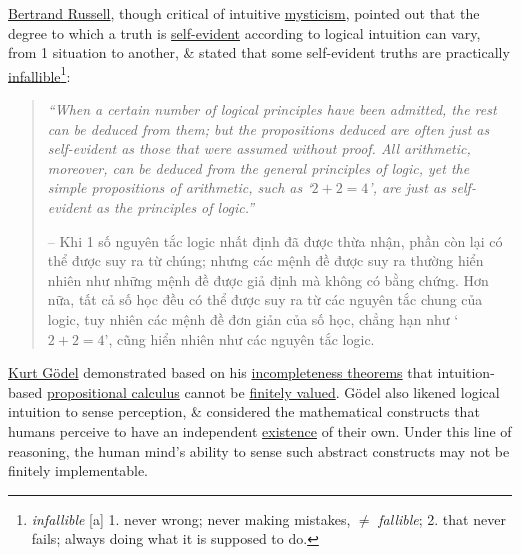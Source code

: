 \documentclass{article}
\begin{document}
\href{https://en.wikipedia.org/wiki/Bertrand_Russell}{\sc Bertrand Russell}, though critical of intuitive \href{https://en.wikipedia.org/wiki/Mysticism#Intuitive_insight_and_enlightenment}{mysticism}, pointed out that the degree to which a truth is \href{https://en.wikipedia.org/wiki/Self-evidence}{self-evident} according to logical intuition can vary, from 1 situation to another, \& stated that some self-evident truths are practically \href{https://en.wikipedia.org/wiki/Infallibility#In_philosophy}{infallible}\footnote{{\it infallible} [a] 1. never wrong; never making mistakes, $\ne$ {\it fallible}; 2. that never fails; always doing what it is supposed to do.}:
\begin{quote}
	{\it``When a certain number of logical principles have been admitted, the rest can be deduced from them; but the propositions deduced are often just as self-evident as those that were assumed without proof. All arithmetic, moreover, can be deduced from the general principles of logic, yet the simple propositions of arithmetic, such as `$2 + 2 = 4$', are just as self-evident as the principles of logic.''}
	
	-- Khi 1 số nguyên tắc logic nhất định đã được thừa nhận, phần còn lại có thể được suy ra từ chúng; nhưng các mệnh đề được suy ra thường hiển nhiên như những mệnh đề được giả định mà không có bằng chứng. Hơn nữa, tất cả số học đều có thể được suy ra từ các nguyên tắc chung của logic, tuy nhiên các mệnh đề đơn giản của số học, chẳng hạn như `$2 + 2 = 4$', cũng hiển nhiên như các nguyên tắc logic.
\end{quote}
\href{https://en.wikipedia.org/wiki/Kurt_G%C3%B6del}{\sc Kurt G\"odel} demonstrated based on his \href{https://en.wikipedia.org/wiki/G%C3%B6del%27s_incompleteness_theorems}{incompleteness theorems} that intuition-based \href{https://en.wikipedia.org/wiki/Propositional_calculus}{propositional calculus} cannot be \href{https://en.wikipedia.org/wiki/Many-valued_logic}{finitely valued}. G\"odel also likened logical intuition to sense perception, \& considered the mathematical constructs that humans perceive to have an independent \href{https://en.wikipedia.org/wiki/Philosophical_realism}{existence} of their own. Under this line of reasoning, the human mind's ability to sense such abstract constructs may not be finitely implementable.
\end{document}
